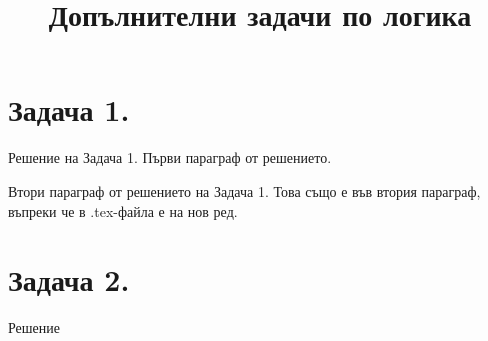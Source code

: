 \documentclass{article}
\title{Допълнителни задачи по логика}
\author{} %
\begin{document}
\maketitle %


\section*{Задача 1.}

Решение на Задача 1. Първи параграф от решението.

Втори параграф от решението на Задача 1.
Това също е във втория параграф, въпреки че в .tex-файла е на нов ред.

\section*{Задача 2.}

Решение
\end{document}
